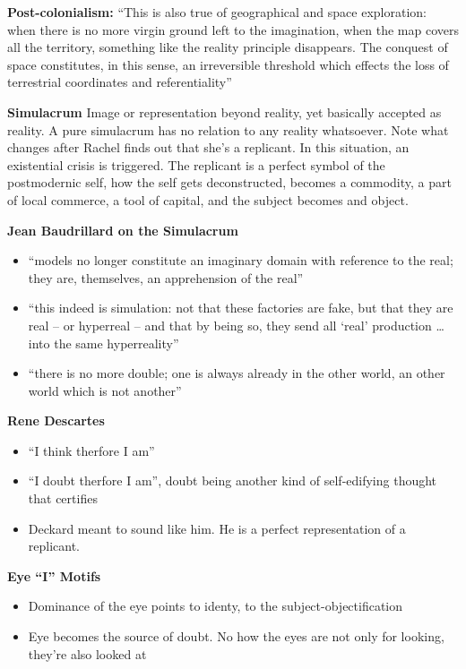 \documentclass[11pt,fleqn]{book} %
\begin{document}
\textbf{Post-colonialism: }\enquote{This is also true of
geographical and space
exploration: when there is no
more virgin ground left to the
imagination, when the map
covers all the territory,
something like the reality
principle disappears. The
conquest of space constitutes,
in this sense, an irreversible
threshold which effects the loss
of terrestrial coordinates and
referentiality}

\textbf{Simulacrum} Image or representation beyond reality, yet basically accepted as reality. A pure simulacrum has no relation to any reality whatsoever. Note what changes after Rachel finds out that she's a replicant. In this situation, an existential crisis is triggered. The replicant is a perfect symbol of the postmodernic self, how the self gets deconstructed, becomes a commodity, a part of local commerce, a tool of capital, and the subject becomes and object. 

\textbf{Jean Baudrillard on the Simulacrum}
\begin{itemize}
    \item \enquote{models no longer constitute an imaginary
domain with reference to the real; they
are, themselves, an apprehension of the
real}
    \item \enquote{this indeed is simulation: not that these
factories are fake, but that they are real –
or hyperreal – and that by being so, they
send all ‘real’ production … into the same
hyperreality}
    \item \enquote{there is no more double; one is always
already in the other world, an other
world which is not another}
\end{itemize}

\textbf{Rene Descartes}
\begin{itemize}
    \item \enquote{I think therfore I am}
    \item \enquote{I doubt therfore I am}, doubt being another kind of self-edifying thought that certifies
    \item Deckard meant to sound like him. He is a perfect representation of a replicant. 
\end{itemize}

\textbf{Eye \enquote{I} Motifs}
\begin{itemize}
    \item Dominance of the eye points to identy, to the subject-objectification
    \item Eye becomes the source of doubt. No how the eyes are not only for looking, they're also looked at
\end{itemize}
\end{document}
